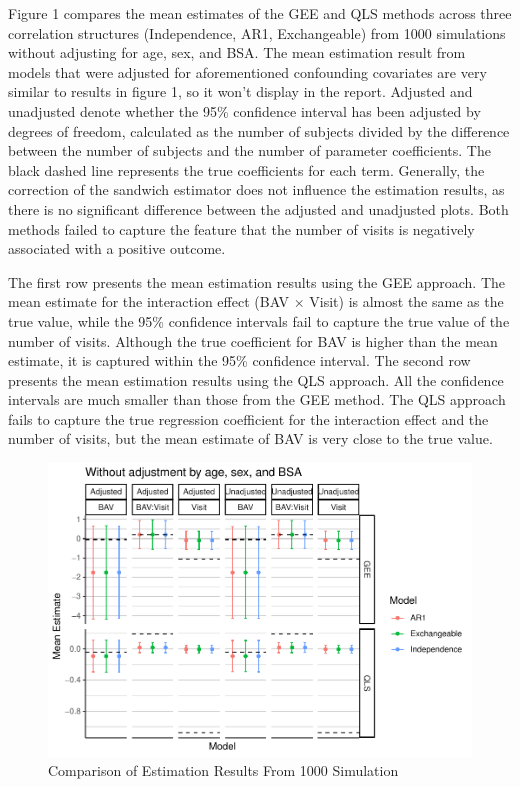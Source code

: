 \documentclass[
]{aft}
\begin{document}
Figure 1 compares the mean estimates of the GEE and QLS methods across
three correlation structures (Independence, AR1, Exchangeable) from 1000
simulations without adjusting for age, sex, and BSA. The mean estimation
result from models that were adjusted for aforementioned confounding
covariates are very similar to results in figure 1, so it won't display
in the report. Adjusted and unadjusted denote whether the 95\%
confidence interval has been adjusted by degrees of freedom, calculated
as the number of subjects divided by the difference between the number
of subjects and the number of parameter coefficients. The black dashed
line represents the true coefficients for each term. Generally, the
correction of the sandwich estimator does not influence the estimation
results, as there is no significant difference between the adjusted and
unadjusted plots. Both methods failed to capture the feature that the
number of visits is negatively associated with a positive outcome.

The first row presents the mean estimation results using the GEE
approach. The mean estimate for the interaction effect (BAV × Visit) is
almost the same as the true value, while the 95\% confidence intervals
fail to capture the true value of the number of visits. Although the
true coefficient for BAV is higher than the mean estimate, it is
captured within the 95\% confidence interval. The second row presents
the mean estimation results using the QLS approach. All the confidence
intervals are much smaller than those from the GEE method. The QLS
approach fails to capture the true regression coefficient for the
interaction effect and the number of visits, but the mean estimate of
BAV is very close to the true value.

\begin{figure}[H]

{\centering \includegraphics{FinalReport_files/figure-pdf/unnamed-chunk-5-1.pdf}

}

\caption{Comparison of Estimation Results From 1000 Simulation}

\end{figure}%
\end{document}

